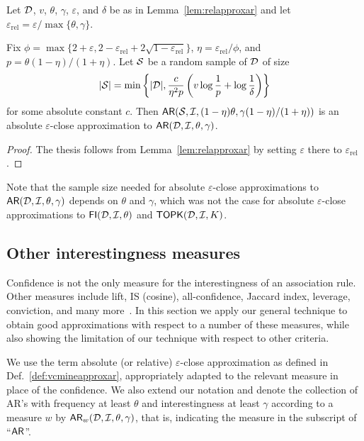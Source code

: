 \begin{lemma}\label{lem:absapproxar}
Let ${\cal D}$, $v$, $\theta$, $\gamma$, $\varepsilon$, and $\delta$ be as in
Lemma~\ref{lem:relapproxar}
and let $\varepsilon_\mathrm{rel}=\varepsilon/\max\{\theta,\gamma\}$.

Fix
$\phi=\max\{2+\varepsilon,2-\varepsilon_\mathrm{rel}+2\sqrt{1-\varepsilon_\mathrm{rel}}\}$,
$\eta=\varepsilon_\mathrm{rel}/\phi$,
and $p=\theta(1-\eta)/(1+\eta)$. Let ${\cal S}$ be a random sample of ${\cal D}$ of
size 
\begin{equation}\label{eq:vcminesamsizeabsapproxar}
|{\cal S}|=\min\left\{|{\cal D}|,\frac{c}{\eta^2p}\left(v\log\frac{1}{p}+\log\frac{1}{\delta}\right)\right\}
\end{equation}
for some absolute constant $c$. Then
$\mathsf{AR}({\cal S},{\cal I},(1-\eta)\theta,\gamma(1-\eta)/(1+\eta))$ is an absolute
$\varepsilon$-close approximation to $\mathsf{AR}({\cal D},{\cal I},\theta,\gamma)$.
\end{lemma}

\begin{proof}
  The thesis follows from Lemma~\ref{lem:relapproxar} by setting $\varepsilon$
  there to $\varepsilon_\mathrm{rel}$.
\end{proof}

Note that the sample size needed for absolute $\varepsilon$-close
approximations to $\mathsf{AR}({\cal D},{\cal I},\theta,\gamma)$ depends on $\theta$ and
$\gamma$, which was not the case for absolute $\varepsilon$-close approximations
to $\mathsf{FI}({\cal D},{\cal I},\theta)$ and $\mathsf{TOPK}({\cal D},{\cal I},K)$.

\subsection{Other interestingness measures}\label{sec:vcminealternative}
Confidence is not the only
measure for the interestingness of an association rule. Other measures include
lift, IS (cosine), all-confidence, Jaccard index, leverage, conviction, and many
more~\citep{TanKS04}. In this section we apply our general technique to obtain good approximations with 
respect to a number of these measures, while also showing the limitation of our technique
with respect to other criteria.

We use the term absolute (or relative) $\varepsilon$-close approximation as
defined in Def.~\ref{def:vcmineapproxar}, appropriately adapted to the relevant
measure in place of the confidence. We also extend our notation and denote the
collection of AR's with frequency at least $\theta$ and interestingness at least
$\gamma$ according to a measure $w$ by $\mathsf{AR}_w({\cal D},{\cal I},\theta,\gamma)$, that is,
indicating the measure in the subscript of ``$\mathsf{AR}$''.

